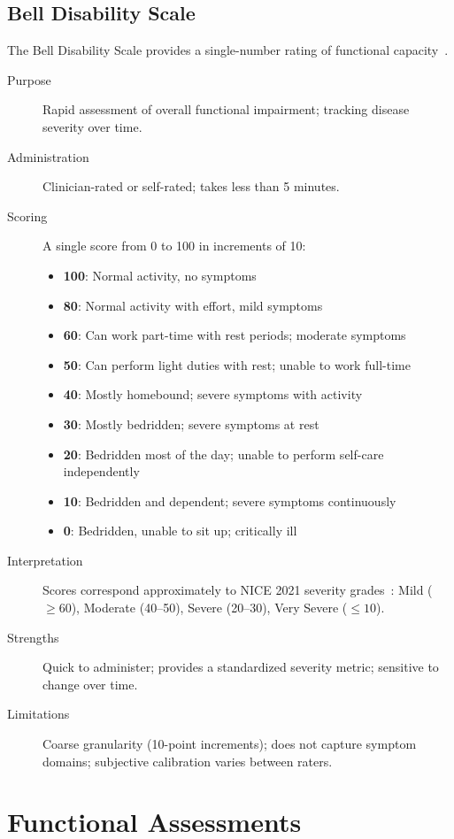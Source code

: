 \subsection{Bell Disability Scale}

The Bell Disability Scale provides a single-number rating of functional capacity~\cite{Roberts2016}.

\begin{description}
\item[Purpose] Rapid assessment of overall functional impairment; tracking disease severity over time.
\item[Administration] Clinician-rated or self-rated; takes less than 5 minutes.
\item[Scoring] A single score from 0 to 100 in increments of 10:
\begin{itemize}
    \item \textbf{100}: Normal activity, no symptoms
    \item \textbf{80}: Normal activity with effort, mild symptoms
    \item \textbf{60}: Can work part-time with rest periods; moderate symptoms
    \item \textbf{50}: Can perform light duties with rest; unable to work full-time
    \item \textbf{40}: Mostly homebound; severe symptoms with activity
    \item \textbf{30}: Mostly bedridden; severe symptoms at rest
    \item \textbf{20}: Bedridden most of the day; unable to perform self-care independently
    \item \textbf{10}: Bedridden and dependent; severe symptoms continuously
    \item \textbf{0}: Bedridden, unable to sit up; critically ill
\end{itemize}
\item[Interpretation] Scores correspond approximately to NICE 2021 severity grades~\cite{NICE2021mecfs}: Mild ($\geq 60$), Moderate (40--50), Severe (20--30), Very Severe ($\leq 10$).
\item[Strengths] Quick to administer; provides a standardized severity metric; sensitive to change over time.
\item[Limitations] Coarse granularity (10-point increments); does not capture symptom domains; subjective calibration varies between raters.
\end{description}

\section{Functional Assessments}
\label{sec:functional-assessments}

